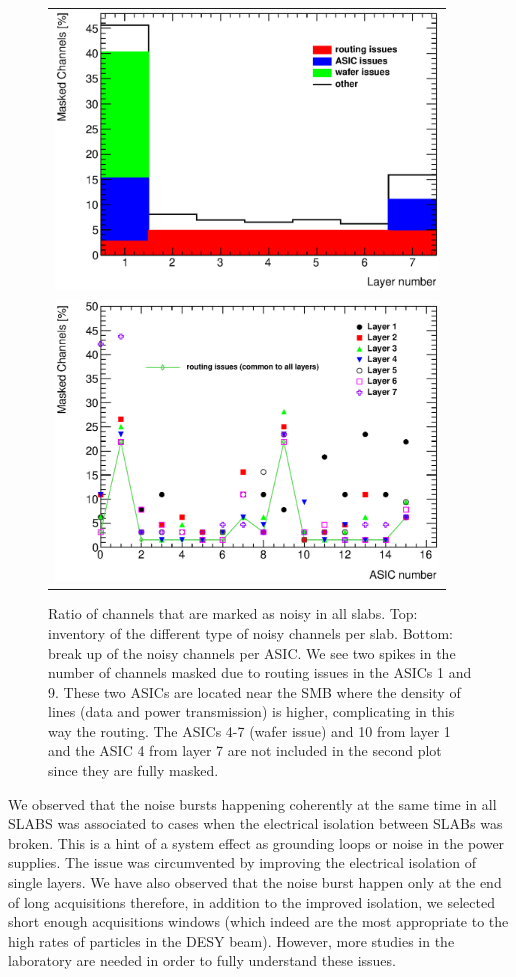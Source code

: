 \documentclass[a4paper,11pt]{article}
\begin{document}
\begin{figure}[!t]
  \centering
  \begin{tabular}{l}
  \includegraphics[width=4in]{figs/commissioning/masked_layer.eps} \\
  \includegraphics[width=4in]{figs/commissioning/masked_chip.eps}
  \end{tabular}
\caption{Ratio of channels that are marked as noisy in all slabs. 
Top: inventory of the different type of noisy channels per slab. 
Bottom: break up of the noisy channels per ASIC. We see two spikes in the number of channels masked due to routing issues in the ASICs 1 and 9. 
These two ASICs are located near the SMB where the density of lines (data and power transmission) is higher, complicating in this way the
routing. The ASICs 4-7 (wafer issue) and 10 from layer 1 and the ASIC 4 from layer 7 are not included
in the second plot since they are fully masked.}
\label{noisycells}
\end{figure}

We observed that the noise bursts happening coherently at the same time in all SLABS
was associated to cases when the electrical isolation between SLABs was broken.
This is a hint of a system effect as grounding loops or noise in the power supplies.
The issue was circumvented by improving the electrical isolation of single layers.
We have also observed that the noise burst happen only at the end of long acquisitions therefore, in addition to the improved isolation,
we selected short enough acquisitions windows (which indeed are the most appropriate to the high rates of particles in the DESY beam).
However, more studies in the laboratory are needed in order to fully understand these issues.
\end{document}
